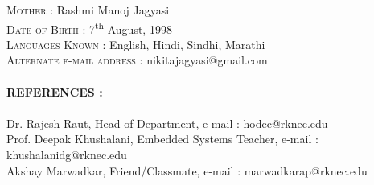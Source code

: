 \documentclass[12pt]{article}
\begin{document}
	\textsc{Mother : }Rashmi Manoj Jagyasi\\
	\textsc{Date of Birth : }7\textsuperscript{th} August, 1998\\
	\textsc{Languages Known : }English, Hindi, Sindhi, Marathi\\
	\textsc{Alternate e-mail address : }nikitajagyasi@gmail.com\\
	\\
	\textbf{\textsc{REFERENCES : }}\\
	\\
	Dr. Rajesh Raut, Head of Department, e-mail : hodec@rknec.edu\\
	Prof. Deepak Khushalani, Embedded Systems Teacher, e-mail : khushalanidg@rknec.edu\\
	Akshay Marwadkar, Friend/Classmate, e-mail : marwadkarap@rknec.edu\\
	\\
\end{document}
